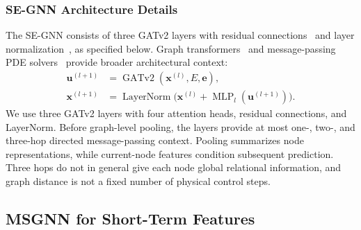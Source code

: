 \documentclass[journal]{IEEEtran}
\begin{document}
\subsubsection{SE-GNN Architecture Details}

The SE-GNN consists of three GATv2 layers with residual connections~\citep{He2016} and layer normalization~\citep{Ba2016}, as specified below. Graph transformers~\citep{rampavsek2022recipe} and message-passing PDE solvers~\citep{brandstetter2022message} provide broader architectural context:
\begin{align}
\mathbf u^{(l+1)} &= \operatorname{GATv2}
 (\mathbf x^{(l)},E,\mathbf e),\\
\mathbf x^{(l+1)} &= \operatorname{LayerNorm}
 \bigl(\mathbf x^{(l)}+\operatorname{MLP}_l(\mathbf u^{(l+1)})\bigr).
\end{align}
We use three GATv2 layers with four attention heads, residual connections, and LayerNorm. Before graph-level pooling, the layers provide at most one-, two-, and three-hop directed message-passing context. Pooling summarizes node representations, while current-node features condition subsequent prediction. Three hops do not in general give each node global relational information, and graph distance is not a fixed number of physical control steps.

\subsection{MSGNN for Short-Term Features}
\end{document}
